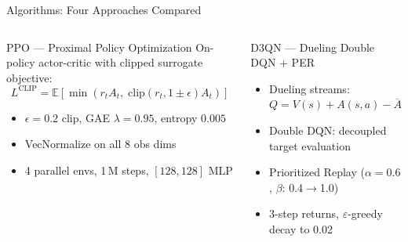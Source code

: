 \documentclass[aspectratio=169]{beamer}
\begin{document}
\begin{frame}{Algorithms: Four Approaches Compared}
  \begin{columns}[T]
      \begin{block}{\textcolor{ppoBlue}{PPO — Proximal Policy Optimization}}
        On-policy actor-critic with clipped surrogate objective:
        \begin{equation*}
          L^{\text{CLIP}} = \mathbb{E}\!\left[\min\!\left(r_t A_t,\;
          \text{clip}(r_t, 1\!\pm\!\epsilon) A_t\right)\right]
        \end{equation*}
        \begin{itemize}\itemsep2pt
          \item $\epsilon=0.2$ clip, GAE $\lambda=0.95$, entropy $0.005$
          \item VecNormalize on all 8 obs dims
          \item 4 parallel envs, 1\,M steps, $[128,128]$ MLP
        \end{itemize}
      \end{block}
      \vspace{4pt}
      \begin{block}{\textcolor{cfOrange}{D3QN — Dueling Double DQN + PER}}
        \begin{itemize}\itemsep2pt
          \item Dueling streams: $Q = V(s) + A(s,a) - \overline{A}$
          \item Double DQN: decoupled target evaluation
          \item Prioritized Replay ($\alpha=0.6$, $\beta$: 0.4$\to$1.0)
          \item 3-step returns, $\varepsilon$-greedy decay to 0.02
        \end{itemize}
      \end{block}


\end{columns}
\end{frame}
\end{document}
